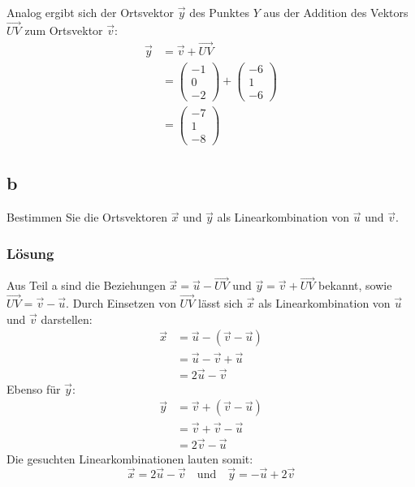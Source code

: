 Analog ergibt sich der Ortsvektor $\vec{y}$ des Punktes $Y$ aus der Addition des Vektors $\vec{UV}$ zum Ortsvektor $\vec{v}$:
\begin{align*}
    \vec{y} & = \vec{v} + \vec{UV}             \\
            & = \begin{pmatrix}
                    -1 \\ 0 \\ -2
                \end{pmatrix} + \begin{pmatrix}
                                    -6 \\ 1 \\ -6
                                \end{pmatrix} \\
            & = \begin{pmatrix}
                    -7 \\ 1 \\ -8
                \end{pmatrix}
\end{align*}

\subsection{b}

Bestimmen Sie die Ortsvektoren $\vec{x}$ und $\vec{y}$ als Linearkombination
von $\vec{u}$ und $\vec{v}$.

\subsubsection*{Lösung}
Aus Teil a sind die Beziehungen $\vec{x} = \vec{u} - \vec{UV}$ und $\vec{y} = \vec{v} + \vec{UV}$ bekannt, sowie $\vec{UV} = \vec{v} - \vec{u}$. Durch Einsetzen von $\vec{UV}$ lässt sich $\vec{x}$ als Linearkombination von $\vec{u}$ und $\vec{v}$ darstellen:
\begin{align*}
    \vec{x} & = \vec{u} - (\vec{v} - \vec{u}) \\
            & = \vec{u} - \vec{v} + \vec{u}   \\
            & = 2\vec{u} - \vec{v}
\end{align*}
Ebenso für $\vec{y}$:
\begin{align*}
    \vec{y} & = \vec{v} + (\vec{v} - \vec{u}) \\
            & = \vec{v} + \vec{v} - \vec{u}   \\
            & = 2\vec{v} - \vec{u}
\end{align*}
Die gesuchten Linearkombinationen lauten somit:
\[
    \vec{x} = 2\vec{u} - \vec{v} \quad \text{und} \quad \vec{y} = - \vec{u} + 2\vec{v}
\]

